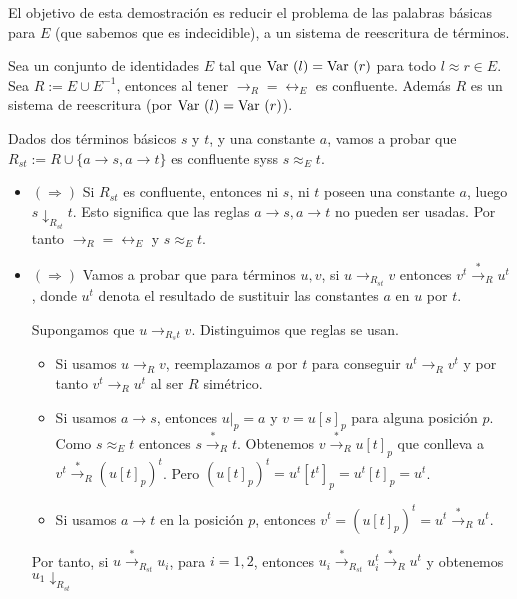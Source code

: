 \begin{demo}
  El objetivo de esta demostración es reducir el problema de las
  palabras básicas para $E$ (que sabemos que es indecidible), a un
  sistema de reescritura de términos.

  Sea un conjunto de identidades $E$ tal que $\mbox{Var }(l) = \mbox{Var }(r)$ para
  todo $l \approx r \in E$. Sea $R := E \cup E^{-1}$, entonces al
  tener $\rightarrow_R = \leftrightarrow_E$ es confluente. Además $R$
  es un sistema de reescritura (por $\mbox{Var }(l) = \mbox{Var }(r)$).

  Dados dos términos básicos $s$ y $t$, y una constante $a$, vamos a
  probar que $R_{st} := R \cup \{ a \rightarrow s, a \rightarrow t \}$
  es confluente syss $s \approx_E t$.

  \begin{itemize}
  \item $(\Rightarrow)$ Si $R_{st}$ es confluente, entonces ni $s$, ni
    $t$ poseen una constante $a$, luego $s \downarrow_{R_{st}} t$. Esto
    significa que las reglas $a \rightarrow s, a \rightarrow t$ no
    pueden ser usadas. Por tanto $\rightarrow_R = \leftrightarrow_E$ y
    $s \approx_E t$.

  \item $(\Rightarrow)$ Vamos a probar que para términos $u, v$, si
    $u \rightarrow_{R_{st}} v$ entonces $v^t \xrightarrow{*}_R u^t$,
    donde $u^t$ denota el resultado de sustituir las constantes $a$ en
    $u$ por $t$.

    Supongamos que $u \rightarrow_{R{_st}} v$. Distinguimos que reglas
    se usan.
    \begin{itemize}
    \item Si usamos $u \rightarrow_R v$, reemplazamos $a$ por $t$ para
      conseguir $u^t \rightarrow_R v^t$ y por tanto
      $v^t \rightarrow_R u^t$ al ser $R$ simétrico.
    \item Si usamos $a \rightarrow s$, entonces $u|_p = a$ y
      $v = u[s]_p$ para alguna posición $p$. Como $s \approx_E t$
      entonces $s \xrightarrow{*}_R t$. Obtenemos
      $v \xrightarrow{*}_R u[t]_p$ que conlleva a
      $v^t \xrightarrow{*}_R (u[t]_p)^t$. Pero $(u[t]_p)^t =
      u^t[t^t]_p = u^t[t]_p = u^t$.
    \item Si usamos $a \rightarrow t$ en la posición $p$, entonces
      $v^t = (u[t]_p)^t = u^t \xrightarrow{*}_R u^t$.
    \end{itemize}
    Por tanto, si $u \xrightarrow{*}_{R_{st}} u_i$, para $i= 1,2$,
    entonces $u_i \xrightarrow{*}_{R_{st}} u_i^t \xrightarrow{*}_R u^t$
    y obtenemos $u_1 \downarrow_{R_{st}}$
  \end{itemize}
\end{demo}

